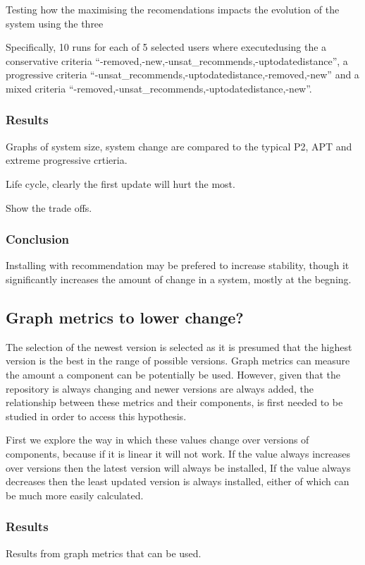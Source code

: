 Testing how the maximising the recomendations impacts the evolution of the system using the three 

Specifically, 10 runs for each of 5 selected users where executedusing the a
conservative criteria ``-removed,-new,-unsat\_recommends,-uptodatedistance'', a progressive criteria ``-unsat\_recommends,-uptodatedistance,-removed,-new''
and a mixed criteria ``-removed,-unsat\_recommends,-uptodatedistance,-new''.

\subsubsection{Results}
Graphs of system size, system change are compared to the typical P2, APT and extreme progressive crtieria.

Life cycle, clearly the first update will hurt the most.

Show the trade offs.


\subsubsection{Conclusion}
Installing with recommendation may be prefered to increase stability, though it significantly increases the amount of change in a system, mostly at the begning.

\subsection{Graph metrics to lower change?}
The selection of the newest version is selected as it is presumed that the highest version is the best in the range of possible versions.
Graph metrics can measure the amount a component can be potentially be used.
However, given that the repository is always changing and newer versions are always added, the relationship between these metrics and their components,
is first needed to be studied in order to access this hypothesis.

First we explore the way in which these values change over versions of components, because if it is linear it will not work.
If the value always increases over versions then the latest version will always be installed,
If the value always decreases then the least updated version is always installed, either of which can be much more easily calculated.

\subsubsection{Results}
Results from graph metrics that can be used.

